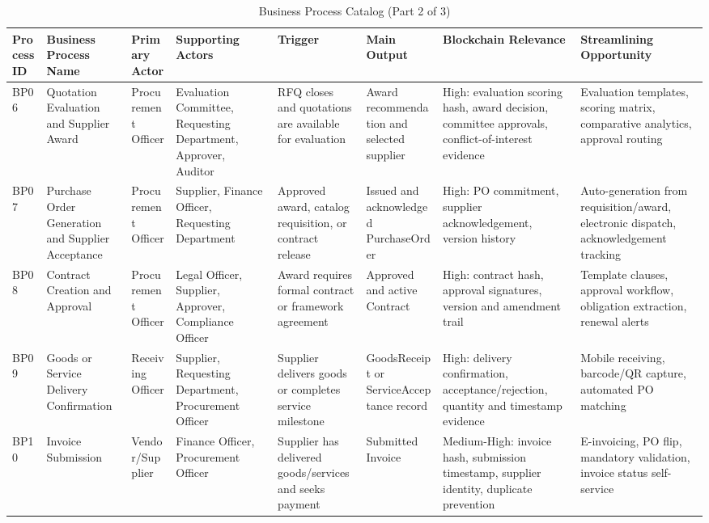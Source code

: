 \documentclass[conference]{IEEEtran}
\begin{document}
\begin{table}[!t]
\caption{Business Process Catalog (Part 2 of 3)}
\label{tab:catalog-2}
\tiny
\begin{tabularx}{\textwidth}{|L{0.85cm}|L{2.3cm}|L{2.1cm}|L{2.6cm}|Y|L{2.0cm}|Y|Y|}
\hline
\textbf{Process ID} & \textbf{Business Process Name} & \textbf{Primary Actor} & \textbf{Supporting Actors} & \textbf{Trigger} & \textbf{Main Output} & \textbf{Blockchain Relevance} & \textbf{Streamlining Opportunity} \\ \hline
BP06 & Quotation Evaluation and Supplier Award & Procurement Officer & Evaluation Committee, Requesting Department, Approver, Auditor & RFQ closes and quotations are available for evaluation & Award recommendation and selected supplier & High: evaluation scoring hash, award decision, committee approvals, conflict-of-interest evidence & Evaluation templates, scoring matrix, comparative analytics, approval routing \\ \hline
BP07 & Purchase Order Generation and Supplier Acceptance & Procurement Officer & Supplier, Finance Officer, Requesting Department & Approved award, catalog requisition, or contract release & Issued and acknowledged PurchaseOrder & High: PO commitment, supplier acknowledgement, version history & Auto-generation from requisition/award, electronic dispatch, acknowledgement tracking \\ \hline
BP08 & Contract Creation and Approval & Procurement Officer & Legal Officer, Supplier, Approver, Compliance Officer & Award requires formal contract or framework agreement & Approved and active Contract & High: contract hash, approval signatures, version and amendment trail & Template clauses, approval workflow, obligation extraction, renewal alerts \\ \hline
BP09 & Goods or Service Delivery Confirmation & Receiving Officer & Supplier, Requesting Department, Procurement Officer & Supplier delivers goods or completes service milestone & GoodsReceipt or ServiceAcceptance record & High: delivery confirmation, acceptance/rejection, quantity and timestamp evidence & Mobile receiving, barcode/QR capture, automated PO matching \\ \hline
BP10 & Invoice Submission & Vendor/Supplier & Finance Officer, Procurement Officer & Supplier has delivered goods/services and seeks payment & Submitted Invoice & Medium-High: invoice hash, submission timestamp, supplier identity, duplicate prevention & E-invoicing, PO flip, mandatory validation, invoice status self-service \\ \hline
\end{tabularx}
\end{table}
\end{document}
